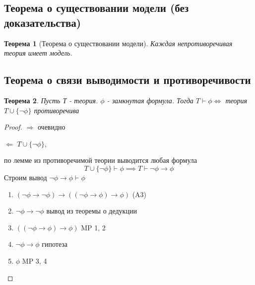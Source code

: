 \documentclass[a4paper]{article}
\newtheorem{theorem}{Теорема}[section]
\theoremstyle{definition}
\theoremstyle{remark}
\begin{document}
    \subsection{Теорема о существовании модели (без доказательства)}
    \begin{theorem}[Теорема о существовании модели]
        Каждая непротиворечивая теория имеет модель. 
    \end{theorem}
    \subsection{Теорема о связи выводимости и противоречивости}
	\begin{theorem}
		Пусть Т - теория. $\phi$ - замкнутая формула. Тогда $T \vdash \phi \Leftrightarrow$ теория $T \cup \{\neg\phi\}$ противоречива
	\end{theorem}
    \begin{proof}
        \item[$\Rightarrow$] очевидно
        \item[$\Leftarrow$] $T\cup \{\neg\phi\}$,
        
        по лемме из противоречимой теории выводится любая формула
        $$T\cup\{\neg\phi\}\vdash \phi \implies T\vdash \neg \phi \to \phi$$
        Строим вывод $\neg \phi\to \phi \vdash \phi$
        \begin{enumerate}
            \item $(\neg \phi \to \neg \phi)\to ((\neg \phi \to \phi)\to \phi)$ (A3)
            \item $\neg \phi\to \neg \phi$ вывод из теоремы о дедукции
            \item $((\neg \phi \to \phi)\to \phi)$ MP 1, 2
            \item $\neg \phi\to \phi$ гипотеза
            \item $\phi$ MP 3, 4
        \end{enumerate}
    \end{proof}
\end{document}
